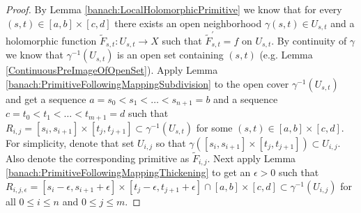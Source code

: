 \begin{proof}
  By Lemma \ref{banach:LocalHolomorphicPrimitive} we know that for every $(s,t) \in [a,b] \times [c,d]$ there exists an open neighborhood $\gamma(s,t) \in U_{s,t}$ and a holomorphic function $\tilde{F}_{s,t} : U_{s,t} \to X$ such that $\tilde{F}^\prime_{s,t} = f$ on $U_{s,t}$.   By continuity of $\gamma$ we know that $\gamma^{-1}(U_{s,t})$ is an open set containing $(s,t)$ (e.g. Lemma \ref{ContinuousPreImageOfOpenSet}).   Apply Lemma \ref{banach:PrimitiveFollowingMappingSubdivision} to the open cover $\gamma^{-1}(U_{s,t})$ and get a sequence $a=s_0 < s_1 < \dotsc < s_{n+1} =b$ and a sequence $c=t_0 < t_1 < \dotsc < t_{m+1} =d$ such that $R_{i,j} = [s_i, s_{i+1}] \times [t_j, t_{j+1}] \subset \gamma^{-1}(U_{s,t})$ for some $(s,t) \in [a,b] \times [c,d]$.  For simplicity, denote that set $U_{i,j}$ so that $\gamma([s_i, s_{i+1}] \times [t_j, t_{j+1}]) \subset U_{i,j}$.  Also denote the corresponding primitive as $\tilde{F}_{i,j}$.    Next apply Lemma \ref{banach:PrimitiveFollowingMappingThickening} to get an $\epsilon>0$ such that $R_{i,j, \epsilon} = [s_i-\epsilon, s_{i+1}+ \epsilon] \times [t_j - \epsilon, t_{j+1}+\epsilon] \cap [a,b] \times [c,d] \subset \gamma^{-1}(U_{i,j})$ for all $0 \leq i \leq n$ and $0 \leq j \leq m$.  


\end{proof}
